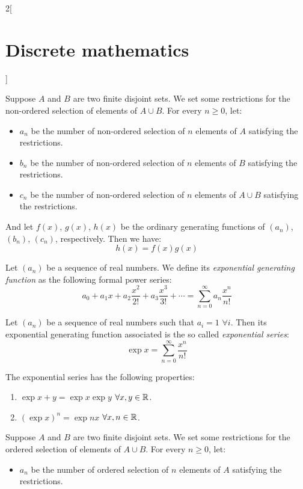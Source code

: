\documentclass[../../../main.tex]{subfiles}
\begin{document}
\begin{multicols}{2}[\section{Discrete mathematics}]
\begin{prop}
    \end{prop}
    \begin{prop}
        Suppose $A$ and $B$ are two finite disjoint sets. We set some restrictions for the non-ordered selection of elements of $A\cup B$. For every $n\geq 0$, let:
        \begin{itemize}
            \item $a_n$ be the number of non-ordered selection of $n$ elements of $A$ satisfying the restrictions.
            \item $b_n$ be the number of non-ordered selection of $n$ elements of $B$ satisfying the restrictions.
            \item $c_n$ be the number of non-ordered selection of $n$ elements of $A\cup B$ satisfying the restrictions.
        \end{itemize}
        And let $f(x)$, $g(x)$, $h(x)$ be the ordinary generating functions of $(a_n)$, $(b_n)$, $(c_n)$, respectively. Then we have: $$h(x)=f(x)g(x)$$
    \end{prop}
    \begin{definition}
        Let $(a_n)$ be a sequence of real numbers. We define its \textit{exponential generating function} as the following formal power series: $$a_0+a_1x+a_2\frac{x^2}{2!}+a_3\frac{x^3}{3!}+\cdots=\sum_{n=0}^\infty a_n\frac{x^n}{n!}$$
    \end{definition}
    \begin{definition}
        Let $(a_n)$ be a sequence of real numbers such that $a_i=1$ $\forall i$. Then its exponential generating function associated is the so called \textit{exponential series}: $$\exp{x}=\sum_{n=0}^\infty \frac{x^n}{n!}$$
    \end{definition}
    \begin{prop}
        The exponential series has the following properties:
        \begin{enumerate}
            \item $\exp{x+y}=\exp{x}\exp{y}$ $\forall x,y\in\mathbb{R} $.
            \item $(\exp{x})^n=\exp{nx}$ $\forall x,n\in\mathbb{R} $.
        \end{enumerate}
    \end{prop}
    \begin{prop}
        Suppose $A$ and $B$ are two finite disjoint sets. We set some restrictions for the ordered selection of elements of $A\cup B$. For every $n\geq 0$, let:
        \begin{itemize}
            \item $a_n$ be the number of ordered selection of $n$ elements of $A$ satisfying the restrictions.

\end{itemize}
\end{prop}
\end{multicols}
\end{document}
